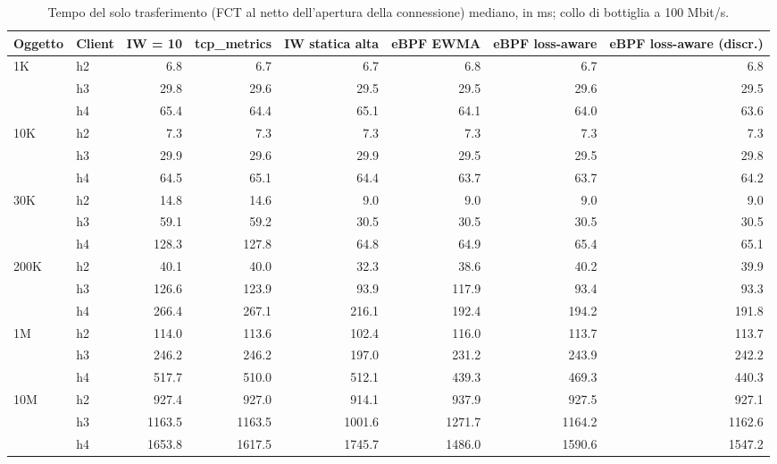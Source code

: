 \begin{table}[htbp]
  \centering
  \caption{Tempo del solo trasferimento (FCT al netto dell'apertura della connessione) mediano, in ms; collo di bottiglia a 100 Mbit/s.}
  \label{tab:trasf-med-100}
  \begin{tabular}{llrrrrrr}
    \toprule
    Oggetto & Client & IW = 10 & tcp\_metrics & IW statica alta & eBPF EWMA & eBPF loss-aware & eBPF loss-aware (discr.) \\
    \midrule
    1K & h2 & 6.8 & 6.7 & 6.7 & 6.8 & 6.7 & 6.8 \\
     & h3 & 29.8 & 29.6 & 29.5 & 29.5 & 29.6 & 29.5 \\
     & h4 & 65.4 & 64.4 & 65.1 & 64.1 & 64.0 & 63.6 \\
    \addlinespace
    10K & h2 & 7.3 & 7.3 & 7.3 & 7.3 & 7.3 & 7.3 \\
     & h3 & 29.9 & 29.6 & 29.9 & 29.5 & 29.5 & 29.8 \\
     & h4 & 64.5 & 65.1 & 64.4 & 63.7 & 63.7 & 64.2 \\
    \addlinespace
    30K & h2 & 14.8 & 14.6 & 9.0 & 9.0 & 9.0 & 9.0 \\
     & h3 & 59.1 & 59.2 & 30.5 & 30.5 & 30.5 & 30.5 \\
     & h4 & 128.3 & 127.8 & 64.8 & 64.9 & 65.4 & 65.1 \\
    \addlinespace
    200K & h2 & 40.1 & 40.0 & 32.3 & 38.6 & 40.2 & 39.9 \\
     & h3 & 126.6 & 123.9 & 93.9 & 117.9 & 93.4 & 93.3 \\
     & h4 & 266.4 & 267.1 & 216.1 & 192.4 & 194.2 & 191.8 \\
    \addlinespace
    1M & h2 & 114.0 & 113.6 & 102.4 & 116.0 & 113.7 & 113.7 \\
     & h3 & 246.2 & 246.2 & 197.0 & 231.2 & 243.9 & 242.2 \\
     & h4 & 517.7 & 510.0 & 512.1 & 439.3 & 469.3 & 440.3 \\
    \addlinespace
    10M & h2 & 927.4 & 927.0 & 914.1 & 937.9 & 927.5 & 927.1 \\
     & h3 & 1163.5 & 1163.5 & 1001.6 & 1271.7 & 1164.2 & 1162.6 \\
     & h4 & 1653.8 & 1617.5 & 1745.7 & 1486.0 & 1590.6 & 1547.2 \\
    \bottomrule
  \end{tabular}
\end{table}
